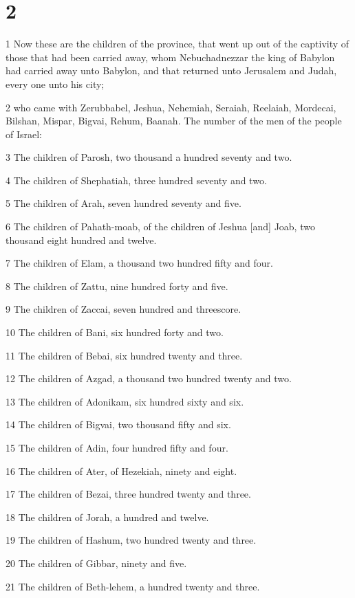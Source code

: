 \chapter{2}

\par 1 Now these are the children of the province, that went up out of the captivity of those that had been carried away, whom Nebuchadnezzar the king of Babylon had carried away unto Babylon, and that returned unto Jerusalem and Judah, every one unto his city;
\par 2 who came with Zerubbabel, Jeshua, Nehemiah, Seraiah, Reelaiah, Mordecai, Bilshan, Mispar, Bigvai, Rehum, Baanah. The number of the men of the people of Israel:
\par 3 The children of Parosh, two thousand a hundred seventy and two.
\par 4 The children of Shephatiah, three hundred seventy and two.
\par 5 The children of Arah, seven hundred seventy and five.
\par 6 The children of Pahath-moab, of the children of Jeshua [and] Joab, two thousand eight hundred and twelve.
\par 7 The children of Elam, a thousand two hundred fifty and four.
\par 8 The children of Zattu, nine hundred forty and five.
\par 9 The children of Zaccai, seven hundred and threescore.
\par 10 The children of Bani, six hundred forty and two.
\par 11 The children of Bebai, six hundred twenty and three.
\par 12 The children of Azgad, a thousand two hundred twenty and two.
\par 13 The children of Adonikam, six hundred sixty and six.
\par 14 The children of Bigvai, two thousand fifty and six.
\par 15 The children of Adin, four hundred fifty and four.
\par 16 The children of Ater, of Hezekiah, ninety and eight.
\par 17 The children of Bezai, three hundred twenty and three.
\par 18 The children of Jorah, a hundred and twelve.
\par 19 The children of Hashum, two hundred twenty and three.
\par 20 The children of Gibbar, ninety and five.
\par 21 The children of Beth-lehem, a hundred twenty and three.
